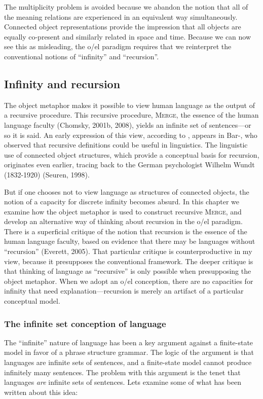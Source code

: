   The multiplicity problem is avoided because we abandon the notion that all of the meaning relations are experienced in an equivalent way simultaneously. Connected object representations provide the impression that all objects are equally co-present and similarly related in space and time. Because we can now see this as misleading, the o/el paradigm requires that we reinterpret the conventional notions of “infinity” and “recursion”.

\subsection{Infinity and recursion}

The object metaphor makes it possible to view human language as the output of a recursive procedure. This recursive procedure, \textsc{Merge}, the essence of the human language faculty (Chomsky, 2001b, 2008), yields an infinite set of sentences—or so it is said. An early expression of this view, according to \citet{Tomalin2007}, appears in Bar-\citet{Hillel1953}, who observed that recursive definitions could be useful in linguistics. The linguistic use of connected object structures, which provide a conceptual basis for recursion, originates even earlier, tracing back to the German psychologist Wilhelm Wundt (1832-1920) (Seuren, 1998).

  But if one chooses not to view language as structures of connected objects, the notion of a capacity for discrete infinity becomes absurd. In this chapter we examine how the object metaphor is used to construct recursive \textsc{Merge}, and develop an alternative way of thinking about recursion in the o/el paradigm. There is a superficial critique of the notion that recursion is the essence of the human language faculty, based on evidence that there may be languages without “recursion” (Everett, 2005). That particular critique is counterproductive in my view, because it presupposes the conventional framework. The deeper critique is that thinking of language as “recursive” is only possible when presupposing the object metaphor. When we adopt an o/el conception, there are no capacities for infinity that need explanation—recursion is merely an artifact of a particular conceptual model.

\subsubsection{The infinite set conception of language}

The “infinite” nature of language has been a key argument against a finite-state model in favor of a phrase structure grammar. The logic of the argument is that languages are infinite sets of sentences, and a finite-state model cannot produce infinitely many sentences. The problem with this argument is the tenet that languages \textit{are} infinite sets of sentences. Lets examine some of what has been written about this idea:  

